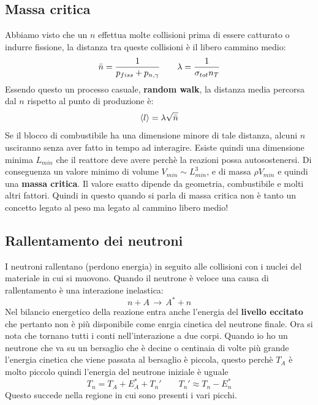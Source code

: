\subsection{Massa critica}
Abbiamo visto che un $n$ effettua molte collisioni prima di essere catturato o indurre fissione, la distanza tra queste collisioni è il libero cammino medio:
\begin{equation*}
    \Bar{n}=\frac{1}{p_{fiss}+p_{n,\gamma}}\qquad \lambda=\frac{1}{\sigma_{tot}n_T}
\end{equation*}
Essendo questo un processo casuale, \textbf{random walk}, la distanza media percorsa dal $n$ rispetto al punto di produzione è:
\begin{equation*}
    	\left \langle l \right \rangle =\lambda\sqrt{\Bar{n}}
\end{equation*}
Se il blocco di combustibile ha una dimensione minore di tale distanza, alcuni $n$ usciranno senza aver fatto in tempo ad interagire. Esiste quindi una dimensione minima $L_{min}$ che il reattore deve avere perchè la reazioni possa autosostenersi. Di conseguenza un valore minimo di volume $V_{min}\sim L_{min}^3$, e di massa $\rho V_{min}$ e quindi una \textbf{massa critica}. Il valore esatto dipende da geometria, combustibile e molti altri fattori. Quindi in questo quando si parla di massa critica non è tanto un concetto legato al peso ma legato al cammino libero medio!
\subsection{Rallentamento dei neutroni}
I neutroni rallentano (perdono energia) in seguito alle collisioni con i nuclei del materiale in cui si muovono. Quando il neutrone è veloce una causa di rallentamento è una interazione inelastica:
\begin{equation*}
    n+A\,\to\, A^*+n
\end{equation*}
Nel bilancio energetico della reazione entra anche l'energia del \textbf{livello eccitato} che pertanto non è più disponibile come enrgia cinetica del neutrone finale. Ora si nota che tornano tutti i conti nell'interazione a due corpi. Quando io ho un neutrone che va su un bersaglio che è decine o centinaia di volte più grande l'energia cinetica che viene passata al bersaglio è piccola, questo perchè $T_A$ è molto piccolo quindi l'energia del neutrone iniziale è uguale
\begin{equation*}
    T_n=T_A+E^*_A+T_n' \qquad T_n'\approx T_n-E^*_n
\end{equation*}
Questo succede nella regione in cui sono presenti i vari picchi.

